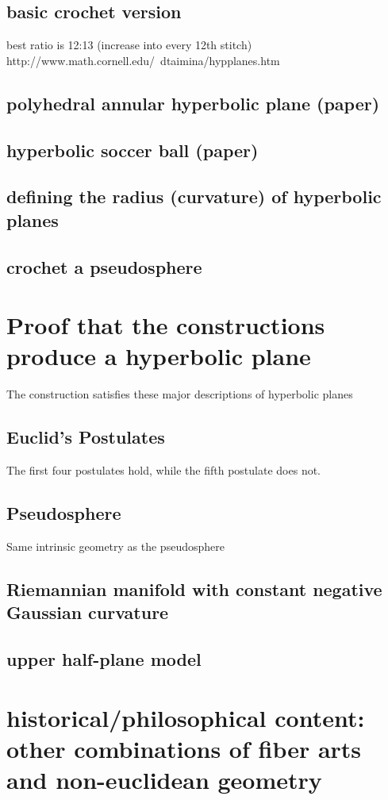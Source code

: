 \documentclass[letterpaper,titlepage]{article}
\begin{document}
\subsection{basic crochet version}
best ratio is 12:13 (increase into every 12th stitch) http://www.math.cornell.edu/~dtaimina/hypplanes.htm
\subsection{polyhedral annular hyperbolic plane (paper)}
\subsection{hyperbolic soccer ball (paper)}
\subsection{defining the radius (curvature) of hyperbolic planes}
\subsection{crochet a pseudosphere}

\section{Proof that the constructions produce a hyperbolic plane}
The construction satisfies these major descriptions of hyperbolic planes
\subsection{Euclid's Postulates}
The first four postulates hold, while the fifth postulate does not.
\subsection{Pseudosphere}
Same intrinsic geometry as the pseudosphere
\subsection{Riemannian manifold with constant negative Gaussian curvature}
\subsection{upper half-plane model}

\section{historical/philosophical content: other combinations of fiber arts and non-euclidean geometry}
\end{document}

